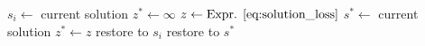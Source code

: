 \begin{algorithm}[htbp]
    \caption{\texttt{move\_items\_multi}}
    \begin{algorithmic}[1]
        \State $s_i \gets$ current solution \SemiCol $z^* \gets \infty$
               
            \State{} 
            \State $z \gets \text{Expr. {\ref{eq:solution_loss}}}$
                \State $s^* \gets$ current solution
                \SemiCol $z^* \gets z$
            \EndIf
            \State restore to $s_i$
        \EndFor
        \State restore to $s^*$
    \end{algorithmic}
    \label{alg:move_items_multi}
\end{algorithm}